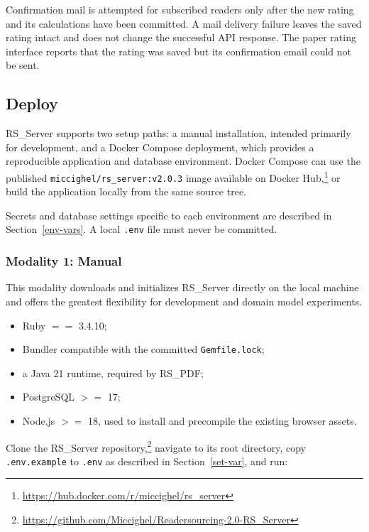 \documentclass[a4paper, english]{article}
\newcounter{subsubsubsection}[subsubsection]
\newcommand{\rsserver}{RS\_Server\xspace}
\newcommand{\rspdf}{RS\_PDF\xspace}
\begin{document}
Confirmation mail is attempted for subscribed readers only after the new rating and its calculations have been committed. A mail delivery failure leaves the saved rating intact and does not change the successful API response. The paper rating interface reports that the rating was saved but its confirmation email could not be sent.

\subsection{Deploy}

\rsserver supports two setup paths: a manual installation, intended primarily for development, and a Docker Compose deployment, which provides a reproducible application and database environment. Docker Compose can use the published \verb|miccighel/rs_server:v2.0.3| image available on Docker Hub,\footnote{\url{https://hub.docker.com/r/miccighel/rs_server}} or build the application locally from the same source tree.

Secrets and database settings specific to each environment are described in Section~\ref{env-vars}. A local \verb|.env| file must never be committed.

\subsubsection{Modality 1: Manual}

\label{deploy1}

This modality downloads and initializes \rsserver directly on the local machine and offers the greatest flexibility for development and domain model experiments.


\begin{itemize}
\item Ruby $==$ 3.4.10;
\item Bundler compatible with the committed \verb|Gemfile.lock|;
\item a Java 21 runtime, required by \rspdf;
\item PostgreSQL $>=$ 17;
\item Node.js $>=$ 18, used to install and precompile the existing browser assets.
\end{itemize}


Clone the \rsserver repository,\footnote{\url{https://github.com/Miccighel/Readersourcing-2.0-RS_Server}} navigate to its root directory, copy \verb|.env.example| to \verb|.env| as described in Section~\ref{set-var}, and run:
\end{document}
